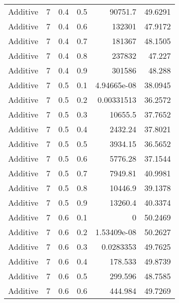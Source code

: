 \documentclass{article}
\begin{document}
\begin{longtable}[H]{lrrrrr}
 Additive       &       7 &   0.4 &            0.5 &  90751.7         &         49.6291 \\
 Additive       &       7 &   0.4 &            0.6 & 132301           &         47.9172 \\
 Additive       &       7 &   0.4 &            0.7 & 181367           &         48.1505 \\
 Additive       &       7 &   0.4 &            0.8 & 237832           &         47.227  \\
 Additive       &       7 &   0.4 &            0.9 & 301586           &         48.288  \\
 Additive       &       7 &   0.5 &            0.1 &      4.94665e-08 &         38.0945 \\
 Additive       &       7 &   0.5 &            0.2 &      0.00331513  &         36.2572 \\
 Additive       &       7 &   0.5 &            0.3 &  10655.5         &         37.7652 \\
 Additive       &       7 &   0.5 &            0.4 &   2432.24        &         37.8021 \\
 Additive       &       7 &   0.5 &            0.5 &   3934.15        &         36.5652 \\
 Additive       &       7 &   0.5 &            0.6 &   5776.28        &         37.1544 \\
 Additive       &       7 &   0.5 &            0.7 &   7949.81        &         40.9981 \\
 Additive       &       7 &   0.5 &            0.8 &  10446.9         &         39.1378 \\
 Additive       &       7 &   0.5 &            0.9 &  13260.4         &         40.3374 \\
 Additive       &       7 &   0.6 &            0.1 &      0           &         50.2469 \\
 Additive       &       7 &   0.6 &            0.2 &      1.53409e-08 &         50.2627 \\
 Additive       &       7 &   0.6 &            0.3 &      0.0283353   &         49.7625 \\
 Additive       &       7 &   0.6 &            0.4 &    178.533       &         49.8739 \\
 Additive       &       7 &   0.6 &            0.5 &    299.596       &         48.7585 \\
 Additive       &       7 &   0.6 &            0.6 &    444.984       &         49.7269 \\

\end{longtable}
\end{document}
